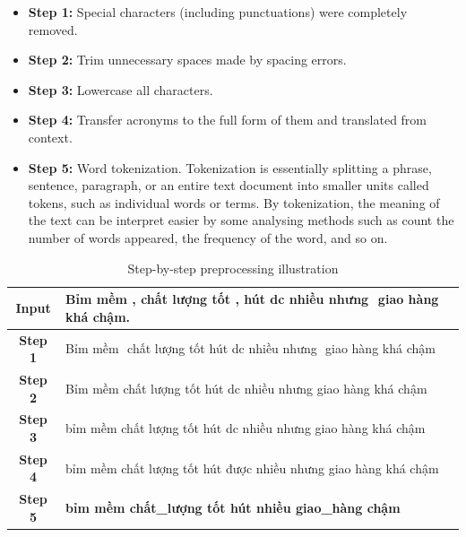 \begin{itemize}
  \item \textbf{Step 1:} Special characters (including punctuations) were completely removed.
  \item \textbf{Step 2:} Trim unnecessary spaces made by spacing errors.
  \item \textbf{Step 3:} Lowercase all characters.
  \item \textbf{Step 4:} Transfer acronyms to the full form of them and translated from context.
  \item \textbf{Step 5:} Word tokenization. Tokenization is essentially splitting a phrase, sentence, paragraph, or an entire text document into smaller units called tokens, such as individual words or terms. By tokenization, the meaning of the text can be interpret easier by some analysing methods such as count the number of words appeared, the frequency of the word, and so on.
\end{itemize}


\begin{table}[]
\begin{otherlanguage}{vietnamese}
\begin{tabular}{|c|>{\raggedright\arraybackslash}m{13 cm}|}
\hline
\textbf{Input}  & \textbf{Bỉm mềm , chất lượng tốt , hút dc nhiều nhưng \(  \) giao hàng khá chậm.} \\ \hline
\textbf{Step 1} & Bỉm mềm \(  \) chất lượng tốt\(  \) hút dc nhiều nhưng \(  \) giao hàng khá chậm                     \\ \hline
\textbf{Step 2} & Bỉm mềm chất lượng tốt hút dc nhiều nhưng giao hàng khá chậm                        \\ \hline
\textbf{Step 3} & bỉm mềm chất lượng tốt hút dc nhiều nhưng giao hàng khá chậm                        \\ \hline
\textbf{Step 4} & bỉm mềm chất lượng tốt hút được nhiều nhưng giao hàng khá chậm                      \\ \hline
\textbf{Step 5} & \textbf{bỉm mềm chất\_lượng tốt hút nhiều giao\_hàng chậm}                          \\ \hline
\end{tabular}
\end{otherlanguage}
\caption{Step-by-step preprocessing illustration}
\label{tab:my-table}
\end{table}

